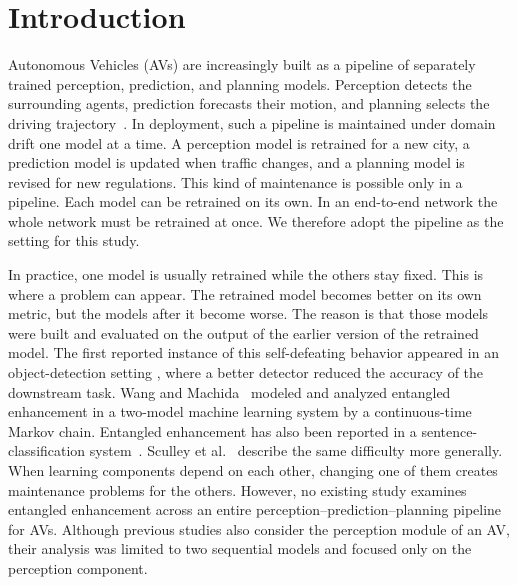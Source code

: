\documentclass[conference]{IEEEtran}
\begin{document}
\section{Introduction}
Autonomous Vehicles (AVs) are increasingly built as a pipeline of separately trained
perception, prediction, and planning models. Perception detects the surrounding agents,
prediction forecasts their motion, and planning selects the driving
trajectory~\cite{chen2024e2esurvey,hu2023uniad}. In deployment, such a pipeline
is maintained under domain drift one model at a time. A perception model is
retrained for a new city, a prediction model is updated when traffic changes, and a planning model is revised for new regulations. This kind of maintenance is possible only in a pipeline. Each model can be retrained on its own. In an end-to-end network the whole network must be retrained at once. We therefore adopt the pipeline as the setting for this study.

In practice, one model is usually retrained while the others stay fixed. This is where a problem can appear. The retrained model becomes better on its own metric, but the models after it become worse. The reason is that those models were built and evaluated on the output of the earlier version of the retrained model. The first reported
instance of this self-defeating behavior appeared in an object-detection setting
\cite{wu2021fixesthatfail}, where a better detector reduced the
accuracy of the downstream task. Wang and Machida~\cite{wang2024compsac} modeled and analyzed entangled enhancement in a two-model machine learning system by a
continuous-time Markov chain. Entangled enhancement has also been reported in a
sentence-classification system~\cite{wang2025issre}. Sculley et al.~\cite{sculley2015hidden} describe the same difficulty more generally. When learning components depend on each other, changing one of them creates maintenance problems for the others. However, no existing study examines entangled
enhancement across an entire perception--prediction--planning pipeline for
AVs. Although previous studies also consider the perception module of an AV, their analysis was limited to two sequential models and focused only on the perception component.
\end{document}
